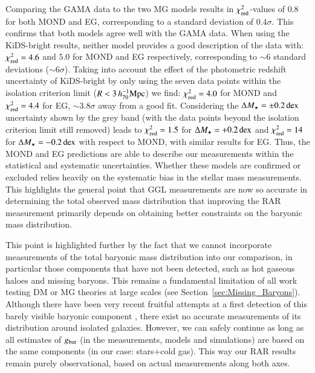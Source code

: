 \documentclass{aa}
\newcommand{\hMpc}{\,h_{70}^{-1}{\rm{Mpc}} }
\newcommand{\dex}{\,{\rm dex}}
\renewcommand{\Updelta}{{\rm \Delta}}
\newcommand{\un}[1]{_{\rm #1}}
\begin{document}
Comparing the GAMA data to the two MG models results in $\chi\un{red}^2$-values of $0.8$ for both MOND and EG, corresponding to a standard deviation of $0.4\sigma$. This confirms that both models agree well with the GAMA data. When using the KiDS-bright results, neither model provides a good description of the data with: $\chi\un{red}^2=4.6$ and $5.0$ for MOND and EG respectively, corresponding to $\sim6$ standard deviations ($\sim6\sigma$). Taking into account the effect of the photometric redshift uncertainty of KiDS-bright by only using the seven data points within the isolation criterion limit ($R < 3 \hMpc$) we find: $\chi\un{red}^2 = 4.0$ for MOND and $\chi\un{red}^2 = 4.4$ for EG, $\sim3.8 \sigma$ away from a good fit. Considering the $\Updelta M_\star=\pm0.2\dex$ uncertainty shown by the grey band (with the data points beyond the isolation criterion limit still removed) leads to $\chi\un{red}^2=1.5$ for $\Updelta M_\star=+0.2\dex$ and $\chi\un{red}^2=14$ for $\Updelta M_\star=-0.2\dex$ with respect to MOND, with similar results for EG. Thus, the MOND and EG predictions are able to describe our measurements within the statistical and systematic uncertainties. Whether these models are confirmed or excluded relies heavily on the systematic bias in the stellar mass measurements. This highlights the general point that GGL measurements are now so accurate in determining the total observed mass distribution that improving the RAR measurement primarily depends on obtaining better constraints on the baryonic mass distribution.

This point is highlighted further by the fact that we cannot incorporate measurements of the total baryonic mass distribution into our comparison, in particular those components that have not been detected, such as hot gaseous haloes and missing baryons. This remains a fundamental limitation of all work testing DM or MG theories at large scales (see Section~\ref{sec:Missing_Baryons}). Although there have been very recent fruitful attempts at a first detection of this barely visible baryonic component \cite[]{macquart2020,tanimura2020}, there exist no accurate measurements of its distribution around isolated galaxies. However, we can safely continue as long as all estimates of $g\un{bar}$ (in the measurements, models and simulations) are based on the same components (in our case: stars+cold gas). This way our RAR results remain purely observational, based on actual measurements along both axes.
	
\end{document}
